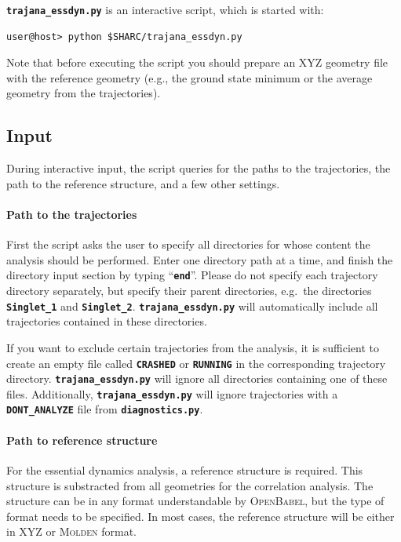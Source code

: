 \documentclass[a4paper,10pt,DIV=15,openany,twoside=false]{scrbook}
\newcommand{\ttt}[1]{\textbf{\texttt{#1}}}
\begin{document}
\ttt{trajana\_essdyn.py} is an interactive script, which is started with:
\begin{verbatim}
user@host> python $SHARC/trajana_essdyn.py
\end{verbatim}
Note that before executing the script you should prepare an XYZ geometry file with the reference geometry (e.g., the ground state minimum or the average geometry from the trajectories).

\subsection{Input}

During interactive input, the script queries for the paths to the trajectories, the path to the reference structure, and a few other settings.

\paragraph{Path to the trajectories}

First the script asks the user to specify all directories for whose content the analysis should be performed. Enter one directory path at a time, and finish the directory input section by typing ``\ttt{end}''. Please do not specify each trajectory directory separately, but specify their parent directories, e.g.\ the directories \ttt{Singlet\_1} and \ttt{Singlet\_2}. \ttt{trajana\_essdyn.py} will automatically include all trajectories contained in these directories.

If you want to exclude certain trajectories from the analysis, it is sufficient to create an empty file called \ttt{CRASHED} or \ttt{RUNNING} in the corresponding trajectory directory. \ttt{trajana\_essdyn.py} will ignore all directories containing one of these files.
Additionally, \ttt{trajana\_essdyn.py} will ignore trajectories with a \ttt{DONT\_ANALYZE} file from \ttt{diagnostics.py}.

\paragraph{Path to reference structure}

For the essential dynamics analysis, a reference structure is required. This structure is substracted from all geometries for the correlation analysis.
The structure can be in any format understandable by \textsc{OpenBabel}, but the type of format needs to be specified.
In most cases, the reference structure will be either in XYZ or \textsc{Molden} format.
\end{document}
